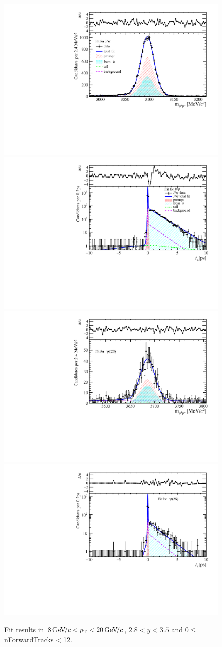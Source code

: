 \begin{figure}[H]
\begin{center}
\includegraphics[width=0.47\linewidth]{pdf/Jpsi/drawmassF/n1y2pt5.pdf}
\includegraphics[width=0.47\linewidth]{pdf/Jpsi/2DFitF/n1y2pt5.pdf}
\vspace*{-0.5cm}
\includegraphics[width=0.47\linewidth]{pdf/Psi2S/drawmassF/n1y2pt5.pdf}
\includegraphics[width=0.47\linewidth]{pdf/Psi2S/2DFitF/n1y2pt5.pdf}
\vspace*{-0.5cm}
\end{center}
\caption{Fit results in $8\text{\,Ge\kern -0.1em V\!/}c<p_{\mathrm{T}}<20\text{\,Ge\kern -0.1em V\!/}c$, $2.8<y<3.5$ and 0$\leq$nForwardTracks$<$12.}
\label{Fitn1y2pt5}
\end{figure}
